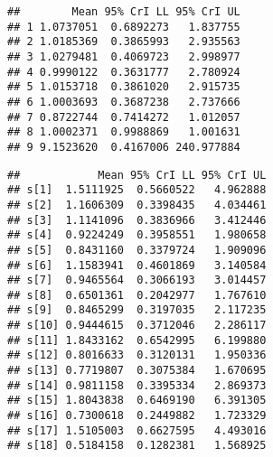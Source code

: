 \documentclass[]{article}
\newenvironment{Shaded}{\begin{snugshade}}{\end{snugshade}}
\newcommand{\CommentTok}[1]{\textcolor[rgb]{0.56,0.35,0.01}{\textit{#1}}}
\newcommand{\ControlFlowTok}[1]{\textcolor[rgb]{0.13,0.29,0.53}{\textbf{#1}}}
\newcommand{\DataTypeTok}[1]{\textcolor[rgb]{0.13,0.29,0.53}{#1}}
\newcommand{\DecValTok}[1]{\textcolor[rgb]{0.00,0.00,0.81}{#1}}
\newcommand{\FloatTok}[1]{\textcolor[rgb]{0.00,0.00,0.81}{#1}}
\newcommand{\KeywordTok}[1]{\textcolor[rgb]{0.13,0.29,0.53}{\textbf{#1}}}
\newcommand{\NormalTok}[1]{#1}
\newcommand{\OperatorTok}[1]{\textcolor[rgb]{0.81,0.36,0.00}{\textbf{#1}}}
\newcommand{\StringTok}[1]{\textcolor[rgb]{0.31,0.60,0.02}{#1}}
\begin{document}
\begin{verbatim}
##        Mean 95% CrI LL 95% CrI UL
## 1 1.0737051  0.6892273   1.837755
## 2 1.0185369  0.3865993   2.935563
## 3 1.0279481  0.4069723   2.998977
## 4 0.9990122  0.3631777   2.780924
## 5 1.0153718  0.3861020   2.915735
## 6 1.0003693  0.3687238   2.737666
## 7 0.8722744  0.7414272   1.012057
## 8 1.0002371  0.9988869   1.001631
## 9 9.1523620  0.4167006 240.977884
\end{verbatim}

\begin{Shaded}
\end{Shaded}

\begin{verbatim}
##            Mean 95% CrI LL 95% CrI UL
## s[1]  1.5111925  0.5660522   4.962888
## s[2]  1.1606309  0.3398435   4.034461
## s[3]  1.1141096  0.3836966   3.412446
## s[4]  0.9224249  0.3958551   1.980658
## s[5]  0.8431160  0.3379724   1.909096
## s[6]  1.1583941  0.4601869   3.140584
## s[7]  0.9465564  0.3066193   3.014457
## s[8]  0.6501361  0.2042977   1.767610
## s[9]  0.8465299  0.3197035   2.117235
## s[10] 0.9444615  0.3712046   2.286117
## s[11] 1.8433162  0.6542995   6.199880
## s[12] 0.8016633  0.3120131   1.950336
## s[13] 0.7719807  0.3075384   1.670695
## s[14] 0.9811158  0.3395334   2.869373
## s[15] 1.8043838  0.6469190   6.391305
## s[16] 0.7300618  0.2449882   1.723329
## s[17] 1.5105003  0.6627595   4.493016
## s[18] 0.5184158  0.1282381   1.568925
\end{verbatim}
\end{document}
